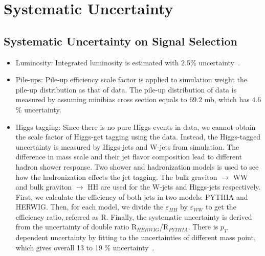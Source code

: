 
\chapter{Systematic Uncertainty} \label{chap:5}

\section{Systematic Uncertainty on Signal Selection} 

\begin{itemize}
  \item Luminosity: Integrated luminosity is estimated with 2.5$\% $ uncertainty~\citep{CMS-PAS-LUM-17-001}. 
  \item Pile-ups: Pile-up efficiency scale factor is applied to simulation weight the pile-up distribution as that of data. The pile-up distribution of data is measured by assuming minibias cross section equals to 69.2 mb, which has 4.6$\% $ uncertainty. 
  \item Higgs tagging: Since there is no pure Higgs events in data, we cannot obtain the scale factor of Higgs-get tagging using the data. Instead, the Higgs-tagged uncertainty is measured by Higgs-jets and W-jets from simulation. The difference in mass scale and their jet flavor composition lead to different hadron shower response. Two shower and hadronization models is used to see how the hadronization effects the jet tagging. The bulk graviton $\rightarrow$ WW and bulk graviton $\rightarrow$ HH are used for the W-jets and Higgs-jets respectively. First, we calculate the efficiency of both jets in two models: PYTHIA and  HERWIG. Then, for each model, we divide the $\varepsilon_{HH}$ by $\varepsilon_{WW}$ to get the efficiency ratio, referred as R. Finally, the systematic uncertainty is derived from the uncertainty of double ratio R$_{HERWIG}$/R$_{PYTHIA}$. There is $p_{T}$ dependent uncertainty by fitting to the uncertainties of different mass point, which gives overall 13 to 19 $\% $ uncertainty~\citep{AN-16-300}.
  

\end{itemize}

